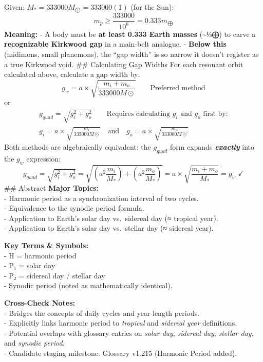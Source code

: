 \documentclass[
  letterpaper,
]{book}
\begin{document}
Given: \(M_* = 333000 M_⨁ = 333000(1)\) (for the Sun): \[
m_p \geq \frac{333000}{10^6} = 0.333 m_⨁
\] \textbf{Meaning:} - A body must be \textbf{at least 0.333 Earth
masses} (\textasciitilde⅓⨁) to carve a \textbf{recognizable Kirkwood
gap} in a main-belt analogue. - \textbf{Below this} (midimons, small
planemons), the ``gap width'' is so narrow it doesn't register as a true
Kirkwood void. \#\# Calculating Gap Widths For each resonant orbit
calculated above, calculate a gap width by: \[
g_w = a \times \sqrt{\frac{m_i + m_o}{333000M⊙}} \qquad \text{Preferred method}
\] or \[
\begin{gather}
g_{quad} = \sqrt{g_i^2 + g_o^2} \qquad \text{Requires calculating $g_i$ and $g_o$ first by:} \\[1em]
g_i = a \times \sqrt{\frac{m_i}{333000M⊙}} \quad\text{and}\quad g_o = a \times \sqrt{\frac{m_o}{333000M⊙}}
\end{gather}
\] Both methods are algebraically equivalent: the \(g_{quad}\) form
expands \textbf{\emph{exactly}} into the \(g_w\) expression: \[
g_{quad} = \sqrt{g_i^2 + g_o^2} = \sqrt{\left(a^2 \frac{m_i}{M_*}\right) + \left(a^2 \frac{m_o}{M_*}\right)} = a \times \sqrt{\frac{m_i + m_o}{M_*}} = g_w \; \checkmark
\] \#\# Abstract \textbf{Major Topics:}\\
- Harmonic period as a synchronization interval of two cycles.\\
- Equivalence to the synodic period formula.\\
- Application to Earth's solar day vs.~sidereal day (≈ tropical year).\\
- Application to Earth's solar day vs.~stellar day (≈ sidereal year).

\textbf{Key Terms \& Symbols:}\\
- H = harmonic period\\
- P₁ = solar day\\
- P₂ = sidereal day / stellar day\\
- Synodic period (noted as mathematically identical).

\textbf{Cross-Check Notes:}\\
- Bridges the concepts of daily cycles and year-length periods.\\
- Explicitly links harmonic period to \emph{tropical} and \emph{sidereal
year} definitions.\\
- Potential overlaps with glossary entries on \emph{solar day},
\emph{sidereal day}, \emph{stellar day}, and \emph{synodic period}.\\
- Candidate staging milestone: Glossary v1.215 (Harmonic Period added).
\end{document}
